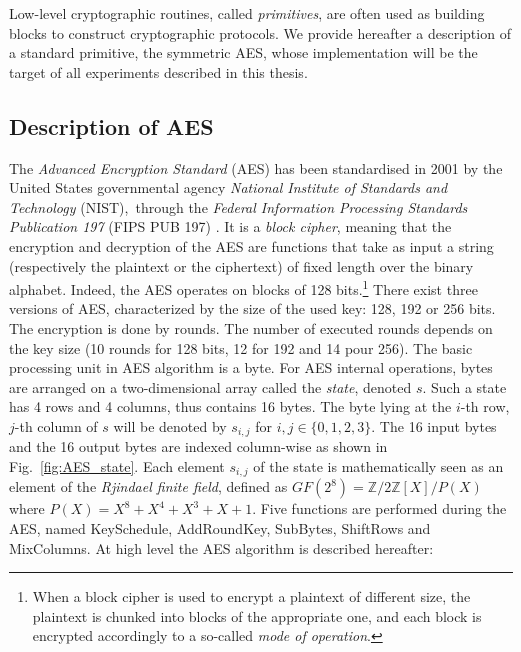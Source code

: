 Low-level cryptographic routines, called \emph{primitives}, are often used as building blocks to construct cryptographic protocols. We provide hereafter a description of a standard primitive, the symmetric AES, whose implementation will be the target of all experiments described in this thesis.

\subsection{Description of AES}
The \emph{Advanced Encryption Standard} (AES) has been standardised in 2001 by the United States governmental agency \emph{National Institute of Standards and Technology} (NIST),\ through the \emph{Federal Information
Processing Standards Publication 197 } (FIPS PUB 197) \cite{nist197}. It is a \emph{block cipher}, meaning that the encryption and decryption of the AES are functions that take as input a string (respectively the plaintext or the ciphertext) of fixed length over the binary alphabet. Indeed, the AES operates on blocks of 128 bits.\footnote{When a block cipher is used to encrypt a plaintext of different size, the plaintext is chunked into blocks of the appropriate one, and each block is encrypted accordingly to a so-called \emph{mode of operation}.} There exist three versions of AES, characterized by the size of the used key: 128, 192 or 256 bits. The encryption is done by rounds. The number of executed rounds depends on the key size (10 rounds for 128 bits, 12 for 192 and 14 pour 256). The basic processing unit in AES algorithm is a byte. For AES internal operations, bytes are arranged on a two-dimensional array called the \emph{state}, denoted $s$. Such a state has 4 rows and 4 columns, thus contains 16 bytes. The byte lying at the $i$-th row, $j$-th column of $s$ will be denoted by $s_{i,j}$ for $i,j\in\{0,1,2,3\}$. The 16 input bytes and the 16 output bytes are indexed column-wise as shown in Fig.~\ref{fig:AES_state}. Each element $s_{i,j}$ of the state is mathematically seen as an element of the \emph{Rjindael finite field}, defined as $GF(2^8) = \mathbb{Z}/{2\mathbb{Z}[X]}/P(X)$ where $P(X) = X^8 + X^4 + X^3 + X + 1$. Five functions are performed during the AES, named KeySchedule, AddRoundKey, SubBytes, ShiftRows and MixColumns. At high level the AES algorithm is described hereafter:
